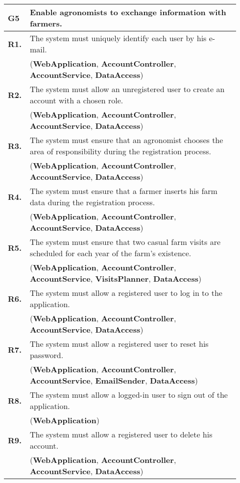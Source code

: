 \begin{longtable}{p{0.06\linewidth} p{0.88\linewidth}} 
    \toprule
    \textbf{G5} & Enable agronomists to exchange information with farmers. \\ 
    \midrule
    
	\textbf{R1.} & The system must uniquely identify each user by his e-mail. \\
	& (\textbf{WebApplication}, \textbf{AccountController}, \textbf{AccountService}, \textbf{DataAccess})\\
	\textbf{R2.} & The system must allow an unregistered user to create an account with a chosen role. \\
	& (\textbf{WebApplication}, \textbf{AccountController}, \textbf{AccountService}, \textbf{DataAccess})\\
	\textbf{R3.} & The system must ensure that an agronomist chooses the area of responsibility during the registration process. \\
	& (\textbf{WebApplication}, \textbf{AccountController}, \textbf{AccountService}, \textbf{DataAccess})\\
	\textbf{R4.} & The system must ensure that a farmer inserts his farm data during the registration process.\\
	& (\textbf{WebApplication}, \textbf{AccountController}, \textbf{AccountService}, \textbf{DataAccess})\\
	\textbf{R5.} & The system must ensure that two casual farm visits are scheduled for each year of the farm's existence.\\
	& (\textbf{WebApplication}, \textbf{AccountController}, \textbf{AccountService}, \textbf{VisitsPlanner},
	\textbf{DataAccess})\\
	\textbf{R6.} & The system must allow a registered user to log in to the application. \\
	& (\textbf{WebApplication}, \textbf{AccountController}, \textbf{AccountService}, \textbf{DataAccess})\\
	\textbf{R7.} & The system must allow a registered user to reset his password. \\
	& (\textbf{WebApplication}, \textbf{AccountController}, \textbf{AccountService}, \textbf{EmailSender}, \textbf{DataAccess})\\
	\textbf{R8.} & The system must allow a logged-in user to sign out of the application. \\
	& (\textbf{WebApplication})\\
	\textbf{R9.} & The system must allow a registered user to delete his account. \\
	& (\textbf{WebApplication}, \textbf{AccountController}, \textbf{AccountService}, \textbf{DataAccess})\\
	

\end{longtable}
